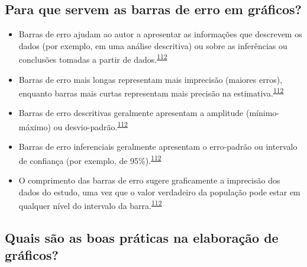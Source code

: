 \documentclass[
  a4paper,
]{book}
\begin{document}
\hypertarget{para-que-servem-as-barras-de-erro-em-gruxe1ficos}{%
\subsection{Para que servem as barras de erro em gráficos?}\label{para-que-servem-as-barras-de-erro-em-gruxe1ficos}}

\begin{itemize}
\item
  Barras de erro ajudam ao autor a apresentar as informações que descrevem os dados (por exemplo, em uma análise descritiva) ou sobre as inferências ou conclusões tomadas a partir de dados.\textsuperscript{\protect\hyperlink{ref-Cumming2007}{112}}
\item
  Barras de erro mais longas representam mais imprecisão (maiores erros), enquanto barras mais curtas representam mais precisão na estimativa.\textsuperscript{\protect\hyperlink{ref-Cumming2007}{112}}
\item
  Barras de erro descritivas geralmente apresentam a amplitude (mínimo-máximo) ou desvio-padrão.\textsuperscript{\protect\hyperlink{ref-Cumming2007}{112}}
\item
  Barras de erro inferenciais geralmente apresentam o erro-padrão ou intervalo de confiança (por exemplo, de 95\%).\textsuperscript{\protect\hyperlink{ref-Cumming2007}{112}}
\item
  O comprimento das barras de erro sugere graficamente a imprecisão dos dados do estudo, uma vez que o valor verdadeiro da população pode estar em qualquer nível do intervalo da barra.\textsuperscript{\protect\hyperlink{ref-Cumming2007}{112}}
\end{itemize}

\hypertarget{quais-suxe3o-as-boas-pruxe1ticas-na-elaborauxe7uxe3o-de-gruxe1ficos}{%
\subsection{Quais são as boas práticas na elaboração de gráficos?}\label{quais-suxe3o-as-boas-pruxe1ticas-na-elaborauxe7uxe3o-de-gruxe1ficos}}
\end{document}
